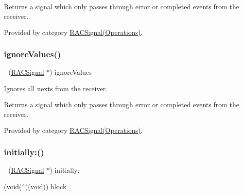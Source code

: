 Returns a signal which only passes through {\ttfamily error} or {\ttfamily completed} events from the receiver. 

Provided by category \mbox{\hyperlink{category_r_a_c_signal_07_operations_08_a2997862d443d16efa3197facb6a354d1}{R\+A\+C\+Signal(\+Operations)}}.

\mbox{\label{interface_r_a_c_signal_a2997862d443d16efa3197facb6a354d1}} 
\subsubsection{\texorpdfstring{ignore\+Values()}{ignoreValues()}\hspace{0.1cm}{\footnotesize\ttfamily [3/3]}}
{\footnotesize\ttfamily -\/ (\mbox{\hyperlink{interface_r_a_c_signal}{R\+A\+C\+Signal}} $\ast$) ignore\+Values \begin{DoxyParamCaption}{ }\end{DoxyParamCaption}}

Ignores all {\ttfamily next}s from the receiver.

Returns a signal which only passes through {\ttfamily error} or {\ttfamily completed} events from the receiver. 

Provided by category \mbox{\hyperlink{category_r_a_c_signal_07_operations_08_a2997862d443d16efa3197facb6a354d1}{R\+A\+C\+Signal(\+Operations)}}.

\mbox{\label{interface_r_a_c_signal_a2c8566a5d3b5997357d34ee5991a2e0c}} 
\subsubsection{\texorpdfstring{initially\+:()}{initially:()}\hspace{0.1cm}{\footnotesize\ttfamily [1/3]}}
{\footnotesize\ttfamily -\/ (\mbox{\hyperlink{interface_r_a_c_signal}{R\+A\+C\+Signal}} $\ast$) initially\+: \begin{DoxyParamCaption}\item[{(void($^\wedge$)(void))}]{block }\end{DoxyParamCaption}}

